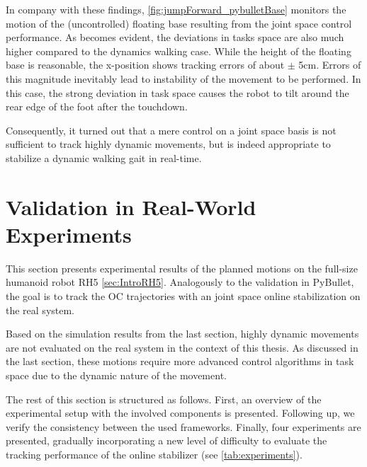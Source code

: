 In company with these findings, \cref{fig:jumpForward_pybulletBase} monitors the motion of the (uncontrolled) floating base resulting from the joint space control performance. As becomes evident, the deviations in tasks space are also much higher compared to the dynamics walking case. While the height of the floating base is reasonable, the x-position shows tracking errors of about $\pm$ 5cm. Errors of this magnitude inevitably lead to instability of the movement to be performed. In this case, the strong deviation in task space causes the robot to tilt around the rear edge of the foot after the touchdown. 

Consequently, it turned out that a mere control on a joint space basis is not sufficient to track highly dynamic movements, but is indeed appropriate to stabilize a dynamic walking gait in real-time. 


\section{Validation in Real-World Experiments}\label{sec:OnlineExperiments}
This section presents experimental results of the planned motions on the full-size humanoid robot RH5 \cref{sec:IntroRH5}. Analogously to the validation in PyBullet, the goal is to track the \gls{OC} trajectories with an joint space online stabilization on the real system. 

Based on the simulation results from the last section, highly dynamic movements are not evaluated on the real system in the context of this thesis. As discussed in the last section, these motions require more advanced control algorithms in task space due to the dynamic nature of the movement. 

The rest of this section is structured as follows. First, an overview of the experimental setup with the involved components is presented. Following up, we verify the consistency between the used frameworks. Finally, four experiments are presented, gradually incorporating a new level of difficulty to evaluate the tracking performance of the online stabilizer (see \cref{tab:experiments}). 

